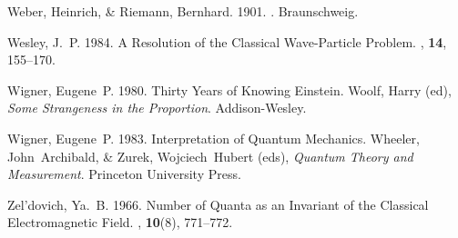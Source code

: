 \documentclass[12pt,secnumarabic,amsmath,amssymb,balancelastpage,nofootinbib]{article}
\begin{document}
\begin{thebibliography}{}
Weber, Heinrich, \& Riemann, Bernhard. 1901.
.
\newblock Braunschweig.

Wesley, J.~P. 1984.
\newblock A Resolution of the Classical Wave-Particle Problem.
, {\bf 14}, 155--170.

Wigner, Eugene~P. 1980.
\newblock Thirty Years of Knowing Einstein.
 Woolf, Harry (ed), {\em Some Strangeness in
  the Proportion}.
\newblock Addison-Wesley.

Wigner, Eugene~P. 1983.
\newblock Interpretation of Quantum Mechanics.
 Wheeler, John~Archibald, \& Zurek,
  Wojciech~Hubert (eds), {\em Quantum Theory and Measurement}.
\newblock Princeton University Press.

Zel'dovich, Ya.~B. 1966.
\newblock Number of Quanta as an Invariant of the Classical Electromagnetic
  Field.
, {\bf 10}(8), 771--772.

\end{thebibliography}
\end{document}

